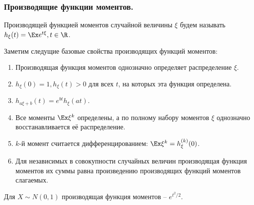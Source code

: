 \subsubsection{Производящие функции моментов.}
\begin{definition}
    Производящей функцией моментов случайной величины $\xi$ будем называть $h_\xi (t) = \Ex e^{t\xi}, t \in \R$.
\end{definition}
\begin{proposition} Заметим следущие базовые свойства производящих функций моментов:
    \begin{enumerate}
        \item Производящая функция моментов однозначно определяет распределение $\xi$.
        \item $h_\xi(0) = 1, h_\xi (t) > 0$ для всех $t$, на которых эта функция определена.
        \item $h_{a\xi + b}(t) = e^{bt}h_\xi(at)$.
        \item Все моменты $\Ex \xi^k$ определены, а по полному набору моментов $\xi$ однозначно восстанавливается её распределение.
        \item $k$-й момент считается дифференцированием: $\Ex \xi^k = h^{(k)}_\xi (0)$.
        \item Для независимых в совокупности случайных величин производящая функция моментов их суммы равна произведению производящих функций моментов слагаемых.
    \end{enumerate}
\end{proposition}
\begin{example}
    Для $X \sim N(0, 1)$ производящая функция моментов -- $e^{t^2/2}$.
\end{example}
